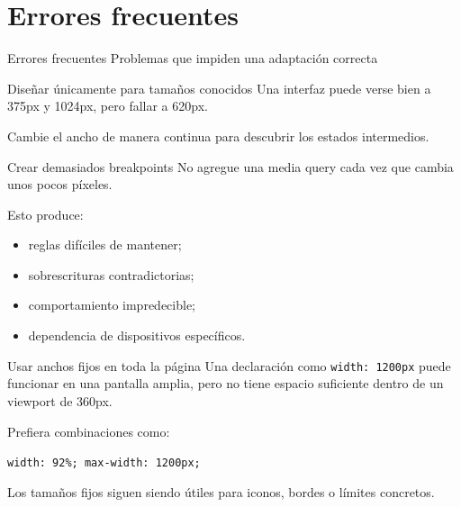 \documentclass[aspectratio=169,11pt]{beamer}
\begin{document}
    \section{Errores frecuentes}

    \SectionSlide
    {Errores frecuentes}
    {Problemas que impiden una adaptación correcta}

    \begin{frame}{Diseñar únicamente para tamaños conocidos}
        Una interfaz puede verse bien a 375px y 1024px, pero fallar a 620px.


        Cambie el ancho de manera continua para descubrir los estados intermedios.
    \end{frame}

    \begin{frame}{Crear demasiados breakpoints}
        No agregue una media query cada vez que cambia unos pocos píxeles.

        Esto produce:

        \begin{itemize}
            \item reglas difíciles de mantener;
            \item sobrescrituras contradictorias;
            \item comportamiento impredecible;
            \item dependencia de dispositivos específicos.
        \end{itemize}

    \end{frame}

    \begin{frame}{Usar anchos fijos en toda la página}
        Una declaración como \texttt{width: 1200px} puede funcionar en una pantalla amplia,
        pero no tiene espacio suficiente dentro de un viewport de 360px.

        Prefiera combinaciones como:

        \begin{center}
            \texttt{width: 92\%; max-width: 1200px;}
        \end{center}

        Los tamaños fijos siguen siendo útiles para iconos, bordes o límites concretos.
    \end{frame}
\end{document}
